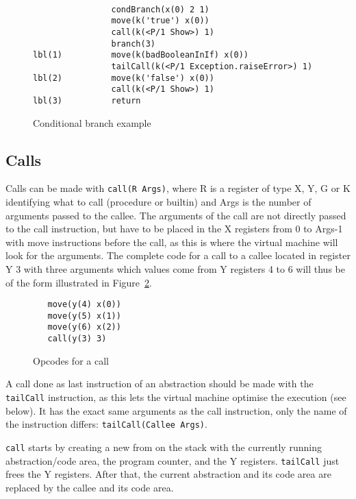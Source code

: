 \documentclass[a4paper]{memoir}
\begin{document}
\begin{figure}[ht]
\begin{lstlisting}

                condBranch(x(0) 2 1)
                move(k('true') x(0))
                call(k(<P/1 Show>) 1)
                branch(3)
lbl(1)          move(k(badBooleanInIf) x(0))
                tailCall(k(<P/1 Exception.raiseError>) 1)
lbl(2)          move(k('false') x(0))
                call(k(<P/1 Show>) 1)
lbl(3)          return

\end{lstlisting}
\caption{Conditional branch example}
\label{fig:target:condBranch}
\end{figure}



\subsection{Calls}\label{sec:opcode:calls}
Calls can be made with \lstinline!call(R Args)!, where R is a register of type
X, Y, G or K
identifying what to call (procedure or builtin) and Args is the number of
arguments passed to the callee. The arguments of the call are not directly
passed to the call instruction, but have to be placed in the X registers from 0
to Args-1 with move instructions before the call, as this is where the virtual
machine will look for the arguments. The complete code for a call to a callee
located in register Y 3 with three arguments which values come from Y registers
4 to 6 will thus be of the form illustrated in
Figure~\ref{fig:opcodes:callexample}.
\begin{figure}[h]
\begin{lstlisting}
   move(y(4) x(0))
   move(y(5) x(1))
   move(y(6) x(2))
   call(y(3) 3)
\end{lstlisting}
\caption{Opcodes for a call}
\label{fig:opcodes:callexample}
\end{figure}


A call done as last instruction of an abstraction should be made with the
\lstinline!tailCall! instruction, as this lets the virtual machine optimise the
execution (see below). It has the exact same arguments as the call instruction, only the
name of the instruction differs: \lstinline!tailCall(Callee Args)!.

\lstinline!call! starts by creating a new from on the stack with the currently
running abstraction/code area, the program counter, and the Y registers.
\lstinline!tailCall! just frees the Y registers.
After that, the current abstraction and its code area are replaced by the callee
and its code area.
\end{document}
